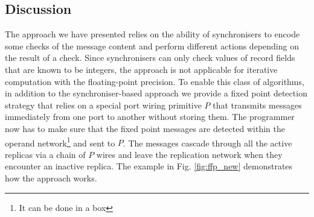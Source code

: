     \subsection{Discussion}
The approach we have presented relies on the ability of synchronisers to encode some checks of the message content and perform different actions depending on the result of a check. Since synchronisers can only check values of record fields that are known to be integers, the approach is not applicable for iterative computation with the floating-point precision. %
To enable this class of algorithms, in addition to the synchroniser-based approach we provide a fixed point detection strategy 
%
%
%
%
%
%
that relies on a special port wiring primitive $P$ that transmits messages immediately from one port to another without storing them. The programmer now has to make sure that the fixed point messages are detected within the operand network\footnote{It can be done in a box} and sent to $P$. The messages cascade through all the active replicas via a chain of $P$ wires and leave the replication network when they encounter an inactive replica. The example in Fig. \ref{fig:ffp_new} demonstrates how the approach works.

